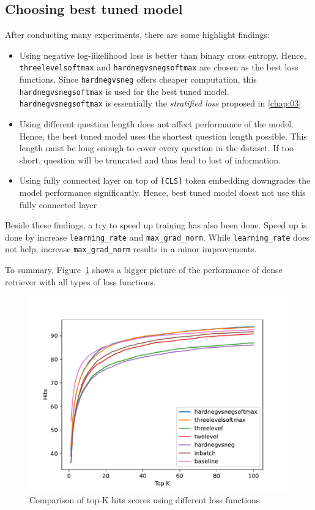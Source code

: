 \documentclass[3p, sort&compress, 12pt]{elsarticle}
\begin{document}
\subsection{Choosing best tuned model}
After conducting many experiments, there are some highlight findings:
\begin{itemize}
	\item Using negative log-likelihood loss is better than binary cross entropy. Hence, {\tt threelevelsoftmax} and {\tt hardnegvsnegsoftmax} are chosen as the best loss functions. Since {\tt hardnegvsneg} offers cheaper computation, this {\tt hardnegvsnegsoftmax} is used for the best tuned model. {\tt hardnegvsnegsoftmax} is essentially the \textit{stratified loss} proposed in \ref{chap:03}
	\item Using different question length does not affect performance of the model. Hence, the best tuned model uses the shortest question length possible. This length must be long enough to cover every question in the dataset. If too short, question will be truncated and thus lead to lost of information.
	\item Using fully connected layer on top of {\tt [CLS]} token embedding downgrades the model performance significantly. Hence, best tuned model doest not use this fully connected layer 
\end{itemize}
\par Beside these findings, a try to speed up training has also been done. Speed up is done by increase {\tt learning\_rate} and {\tt max\_grad\_norm}. While {\tt learning\_rate} does not help, increase {\tt max\_grad\_norm} results in a minor improvements.
\par To summary, Figure~\ref{fig:21} shows a bigger picture of the performance of dense retriever with all types of loss functions.
\begin{figure}
	\centering
	\includegraphics[scale=.7]{images/PDF/experiments/K_hits.pdf}
	\caption{Comparison of top-K hits scores using different loss functions}
	\label{fig:21}
\end{figure}
\end{document}
